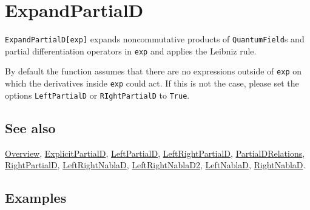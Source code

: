 \documentclass[../FeynCalcManual.tex]{subfiles}
\begin{document}
\hypertarget{expandpartiald}{
\section{ExpandPartialD}\label{expandpartiald}}

\texttt{ExpandPartialD[\allowbreak{}exp]} expands noncommutative
products of \texttt{QuantumField}s and partial differentiation operators
in \texttt{exp} and applies the Leibniz rule.

By default the function assumes that there are no expressions outside of
\texttt{exp} on which the derivatives inside \texttt{exp} could act. If
this is not the case, please set the options \texttt{LeftPartialD} or
\texttt{RIghtPartialD} to \texttt{True}.

\subsection{See also}

\hyperlink{toc}{Overview},
\hyperlink{explicitpartiald}{ExplicitPartialD},
\hyperlink{leftpartiald}{LeftPartialD},
\hyperlink{leftrightpartiald}{LeftRightPartialD},
\hyperlink{partialdrelations}{PartialDRelations},
\hyperlink{rightpartiald}{RightPartialD},
\hyperlink{leftrightnablad}{LeftRightNablaD},
\hyperlink{leftrightnablad2}{LeftRightNablaD2},
\hyperlink{leftnablad}{LeftNablaD},
\hyperlink{rightnablad}{RightNablaD}.

\subsection{Examples}

\begin{Shaded}
\begin{Highlighting}[]
\OperatorTok{[}\SpecialCharTok{\textbackslash{}}\OperatorTok{[}\OperatorTok{]]}\OperatorTok{[}\OperatorTok{,}\OperatorTok{[}\SpecialCharTok{\textbackslash{}}\OperatorTok{[}\OperatorTok{]]]}\OperatorTok{[}\OperatorTok{,}\OperatorTok{[}\SpecialCharTok{\textbackslash{}}\OperatorTok{[}\OperatorTok{]]]} 
 
\OperatorTok{[}\SpecialCharTok{\%}\OperatorTok{]}
\end{Highlighting}
\end{Shaded}
\end{document}
